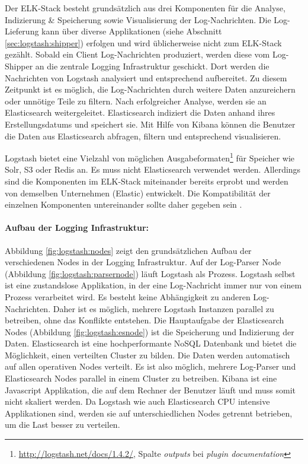 Der ELK-Stack besteht grundsätzlich aus drei Komponenten für die Analyse, Indizierung \& Speicherung sowie Visualisierung der Log-Nachrichten. Die Log-Lieferung kann über diverse Applikationen (siehe Abschnitt \ref{sec:logstash:shipper}) erfolgen und wird üblicherweise nicht zum ELK-Stack gezählt. Sobald ein Client Log-Nachrichten produziert, werden diese vom Log-Shipper an die zentrale Logging Infrastruktur geschickt. Dort werden die Nachrichten von Logstash analysiert und entsprechend aufbereitet. Zu diesem Zeitpunkt ist es möglich, die Log-Nachrichten durch weitere Daten anzureichern oder unnötige Teile zu filtern. Nach erfolgreicher Analyse, werden sie an Elasticsearch weitergeleitet. Elasticsearch indiziert die Daten anhand ihres Erstellungsdatums und speichert sie. Mit Hilfe von Kibana können die Benutzer die Daten aus Elasticsearch abfragen, filtern und entsprechend visualisieren. 

Logstash bietet eine Vielzahl von möglichen Ausgabeformaten\footnote{\url{http://logstash.net/docs/1.4.2/}, Spalte \textit{outputs} bei \textit{plugin documentation}} für Speicher wie Solr, S3 oder Redis an. Es muss nicht Elasticsearch verwendet werden. Allerdings sind die Komponenten im ELK-Stack miteinander bereits erprobt und werden von demselben Unternehmen (Elastic) entwickelt. Die Kompatibilität der einzelnen Komponenten untereinander sollte daher gegeben sein \cite{Papaspyrou2014}.

\paragraph{Aufbau der Logging Infrastruktur:} 
Abbildung \ref{fig:logstash:nodes} zeigt den grundsätzlichen Aufbau der verschiedenen Nodes in der Logging Infrastruktur. Auf der Log-Parser Node (Abbildung \ref{fig:logstash:parsernode}) läuft Logstash als Prozess. Logstash selbst ist eine zustandslose Applikation, in der eine Log-Nachricht immer nur von einem Prozess verarbeitet wird. Es besteht keine Abhängigkeit zu anderen Log-Nachrichten. Daher ist es möglich, mehrere Logstash Instanzen parallel zu betreiben, ohne das Konflikte entstehen. Die Hauptaufgabe der Elasticsearch Nodes (Abbildung \ref{fig:logstash:esnode}) ist die Speicherung und Indizierung der Daten. Elasticsearch ist eine hochperformante NoSQL Datenbank und bietet die Möglichkeit, einen verteilten Cluster zu bilden. Die Daten werden automatisch auf allen operativen Nodes verteilt. Es ist also möglich, mehrere Log-Parser und Elasticsearch Nodes parallel in einem Cluster zu betreiben. Kibana ist eine Javascript Applikation, die auf dem Rechner der Benutzer läuft und muss somit nicht skaliert werden. Da Logstash wie auch Elasticsearch CPU intensive Applikationen sind, werden sie auf unterschiedlichen Nodes getrennt betrieben, um die Last besser zu verteilen.


